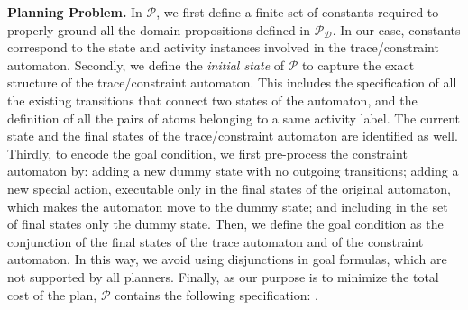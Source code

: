 \smallskip
\noindent
\textbf{Planning Problem.}
%
In $\mathcal{P}$, we first define a finite set of constants required to properly ground all the domain propositions defined in $\mathcal{P_D}$. In our case, constants correspond to the state and activity instances involved in the trace/constraint automaton.
%
Secondly, we define the \emph{initial state} of $\mathcal{P}$ to capture the exact structure of the trace/constraint automaton. This includes the specification of all the existing transitions that connect two states of the automaton, and the definition of all the pairs of atoms belonging to a same activity label. The current state and the final states of the trace/constraint automaton are identified as well.
%
Thirdly, to encode the goal condition, we first pre-process the constraint automaton by: \myi adding a new dummy state with no outgoing transitions; \myii adding a new special action, executable only in the final states of the original automaton, which makes the automaton move to the dummy state; and \myiii including in the set of final states only the dummy state. Then, we define the goal condition as the conjunction of the final states of the trace automaton and of the constraint automaton. In this way, we avoid using disjunctions in goal formulas, which are not supported by all planners.
%
Finally, as our purpose is to minimize the total cost of the plan, $\mathcal{P}$ contains the following specification: .  